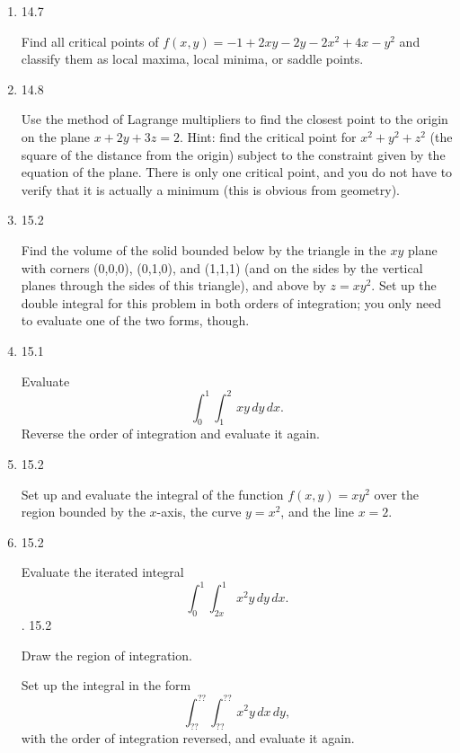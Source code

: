 \documentclass[12pt]{article}
\begin{document}
\begin{enumerate}
\newpage 

\item 14.7

 Find all critical points of $f(x,y)=-1+2xy-2y-2x^2+4x-y^2$ and classify them
as local maxima, local minima, or saddle points.

\newpage

\item 14.8

Use the method of Lagrange multipliers to find the closest point
to the origin on the plane $x+2y+3z=2$.  Hint: find the critical point
for $x^2+y^2+z^2$ (the square of the distance from the origin) subject
to the constraint given by the equation of the plane.  There is only
one critical point, and you do not have to verify that it is actually
a minimum (this is obvious from geometry).

\newpage 

\item  15.2

Find the volume of the solid bounded below by the triangle in the $xy$
plane with corners (0,0,0), (0,1,0), and (1,1,1) (and on the sides by
the vertical planes through the sides of this triangle), and above by
$z=xy^2$.  Set up the double integral for this problem in both orders
of integration; you only need to evaluate one of the two forms,
though.

\newpage 

\item  15.1  

Evaluate $$\int_0^1\int_1^2\,xy\,dy\,dx.$$   Reverse the order of integration and evaluate it again.

\newpage 

\item  15.2

Set up and evaluate the integral of the function $f(x,y) = xy^2$ over the region bounded by the $x$-axis, the curve $y=x^2$, and the line $x=2$.

\newpage

\item  15.2 


Evaluate the iterated integral $$\int_0^1\int_{2x}^1\,x^2y\,dy\,dx.$$. 15.2

Draw the region of integration.

Set up the integral in the form $$\int_{??}^{??}\int_{??}^{??}\,x^2y\,dx\,dy,$$ with the order of integration reversed, and evaluate it again.

\newpage


\end{enumerate}
\end{document}
